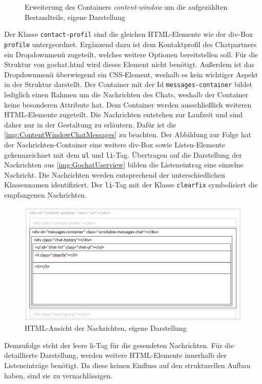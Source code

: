 \documentclass[a4paper,titlepage,halfparskip,12pt]{scrreprt}
\begin{document}
\begin{onehalfspacing}
\begin{figure}[h]
	\caption{Erweiterung des Containers \textit{content-window} um die aufgezählten Bestandteile, eigene Darstellung}
	\label{img:Content-window}
\end{figure}
Der Klasse \texttt{contact-profil} sind die gleichen HTML-Elemente wie der div-Box \texttt{profile} untergeordnet. Ergänzend dazu ist dem Kontaktprofil des Chatpartners ein Dropdownmenü zugeteilt, welches weitere Optionen bereitstellen soll. Für die Struktur von gochat.html wird dieses Element nicht benötigt. Außerdem ist das Dropdownmenü überwiegend ein CSS-Element, weshalb es kein wichtiger Aspekt in der Struktur darstellt. Der Container mit der Id \texttt{messages-container} bildet lediglich einen Rahmen um die Nachrichten des Chats, weshalb der Container keine besonderen Attribute hat. Dem Container werden ausschließlich weiteren HTML-Elemente zugeteilt. Die Nachrichten entstehen zur Laufzeit und sind daher nur in der Gestaltung zu erläutern. Dafür ist die \autoref{img:ContentWindowChatMessages} zu beachten. Der Abbildung zur Folge hat der Nachrichten-Container eine weitere div-Box sowie Listen-Elemente gekennzeichnet mit dem \texttt{ul} und \texttt{li}-Tag. Übertragen auf die Darstellung der Nachrichten aus \autoref{img:GochatUserview} bilden die Listeneintrag eine einzelne Nachricht. Die Nachrichten werden entsprechend der unterschiedlichen Klassennamen identifiziert. Der \texttt{li}-Tag mit der Klasse \texttt{clearfix} symbolisiert die empfangenen Nachrichten.
\begin{figure}[h]
	\centering
	\includegraphics[scale=0.6]{images/ContentWindowChatMessages}
	\caption{HTML-Ansicht der Nachrichten, eigene Darstellung}
	\label{img:ContentWindowChatMessages}
\end{figure}
Demzufolge steht der leere li-Tag für die gesendeten Nachrichten. Für die detaillierte Darstellung, werden weitere HTML-Elemente innerhalb der Listeneinträge benötigt. Da diese keinen Einfluss auf den strukturellen Aufbau haben, sind sie zu vernachlässigen.\\

\end{onehalfspacing}
\end{document}
